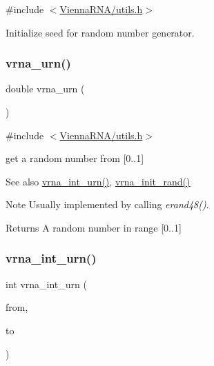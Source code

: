 {\ttfamily \#include $<$\mbox{\hyperlink{utils_8h}{Vienna\+R\+N\+A/utils.\+h}}$>$}



Initialize seed for random number generator. 

\mbox{\label{group__utils_ga384e256ebb295d04a14426179db0dd6e}} 
\subsubsection{\texorpdfstring{vrna\+\_\+urn()}{vrna\_urn()}}
{\footnotesize\ttfamily double vrna\+\_\+urn (\begin{DoxyParamCaption}\item[{void}]{ }\end{DoxyParamCaption})}



{\ttfamily \#include $<$\mbox{\hyperlink{utils_8h}{Vienna\+R\+N\+A/utils.\+h}}$>$}



get a random number from \mbox{[}0..1\mbox{]} 

\begin{DoxySeeAlso}{See also}
\mbox{\hyperlink{group__utils_ga46111bb3747dbcf4609f0d40ae169ad9}{vrna\+\_\+int\+\_\+urn()}}, \mbox{\hyperlink{group__utils_ga0ad1f40ea316e5c5918695c35613027a}{vrna\+\_\+init\+\_\+rand()}} 
\end{DoxySeeAlso}
\begin{DoxyNote}{Note}
Usually implemented by calling {\itshape erand48()}. 
\end{DoxyNote}
\begin{DoxyReturn}{Returns}
A random number in range \mbox{[}0..1\mbox{]} 
\end{DoxyReturn}
\mbox{\label{group__utils_ga46111bb3747dbcf4609f0d40ae169ad9}} 
\subsubsection{\texorpdfstring{vrna\+\_\+int\+\_\+urn()}{vrna\_int\_urn()}}
{\footnotesize\ttfamily int vrna\+\_\+int\+\_\+urn (\begin{DoxyParamCaption}\item[{int}]{from,  }\item[{int}]{to }\end{DoxyParamCaption})}



